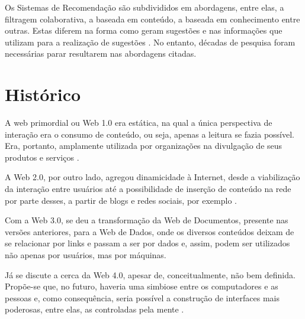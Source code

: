 Os Sistemas de Recomendação são subdivididos em abordagens, entre elas, a filtragem colaborativa, a baseada em conteúdo, a baseada em conhecimento entre outras. Estas diferem na forma como geram sugestões e nas informações que utilizam para a realização de sugestões \cite{Jannach2010}. No entanto, décadas de pesquisa foram necessárias parar resultarem nas abordagens citadas.

\section{Histórico}

A web primordial ou Web 1.0 era estática, na qual a única perspectiva de interação era o consumo de conteúdo, ou seja, apenas a leitura se fazia possível. Era, portanto, amplamente utilizada por organizações na divulgação de seus produtos e serviços \cite{Aghaei2012}. 

A Web 2.0, por outro lado, agregou dinamicidade à Internet, desde a viabilização da interação entre usuários até a possibilidade de inserção de conteúdo na rede por parte desses, a partir de blogs e redes sociais, por exemplo \cite{Nath2014}.

Com a Web 3.0, se deu a transformação da Web de Documentos, presente nas versões anteriores, para a Web de Dados, onde os diversos conteúdos deixam de se relacionar por links e passam a ser por dados e, assim, podem ser utilizados não apenas por usuários, mas por máquinas.
 

Já se discute a cerca da Web 4.0, apesar de, conceitualmente, não bem definida. Propõe-se que, no futuro, haveria uma simbiose entre os computadores e as pessoas e, como consequência, seria possível a construção de interfaces mais poderosas, entre elas, as controladas pela mente \cite{Aghaei2012}.

